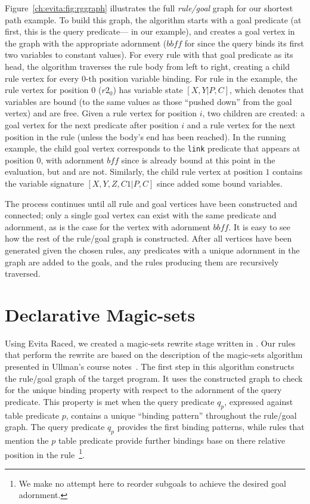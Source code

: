 Figure~\ref{ch:evita:fig:rggraph} illustrates the full {\em rule/goal} graph
for our shortest path example.  To build this graph, the algorithm starts with
a goal predicate (at first, this is the query predicate--- in our
example), and creates a goal vertex in the graph with the appropriate adornment
($\mathit{bbff}$ for  since the query binds its first two variables to
constant values).  For every rule with that goal predicate as its head, the
algorithm traverses the rule body from left to right, creating a child rule
vertex for every $0$-th position variable binding.  For rule  in the
example, the rule vertex for position $0$ ($r2_0$) has variable state
$[X,Y|P,C]$, which denotes that variables  are bound (to the same
values as those ``pushed down'' from the goal vertex) and  are free.
Given a rule vertex for position $i$, two children are created: a goal vertex
for the next predicate after position $i$ and a rule vertex for the next
position in the rule (unless the body's end has been reached).  In the running
example, the child goal vertex corresponds to the {\tt link} predicate that
appears at position $0$, with adornment $\mathit{bff}$ since  is already
bound at this point in the evaluation, but  and  are not.
Similarly, the child rule vertex at position $1$ contains the variable
signature $[X,Y,Z,C1|P,C]$ since  added some bound variables.  

The process continues until all rule and goal vertices have been constructed
and connected; only a single goal vertex can exist with the same predicate and
adornment, as is the case for the  vertex with adornment
$\mathit{bbff}$.  It is easy to see how the rest of the rule/goal graph is
constructed.  After all vertices have been generated given the chosen rules,
any predicates with a unique adornment in the graph are added to the goals, and
the rules producing them are recursively traversed.

\section{Declarative Magic-sets}
\label{ch:magic:sec:rules}

Using Evita Raced, we created a magic-sets rewrite stage written in \OVERLOG.
Our \OVERLOG rules that perform the rewrite are based on the description of the
magic-sets algorithm presented in Ullman's course notes~\cite{ullmanNotes}.
The first step in this algorithm constructs the rule/goal graph of the target
program.  It uses the constructed graph to check for the {\emph unique binding
property} with respect to the adornment of the query predicate.  This property
is met when the query predicate $q_p$, expressed against table predicate $p$,
contains a unique ``binding pattern'' throughout the rule/goal graph.  The
query predicate $q_p$ provides the first binding patterns, while rules that
mention the $p$ table predicate provide further bindings base on there relative
position in the rule~\footnote{We make no attempt here to reorder subgoals to achieve
the desired goal adornment.}.

